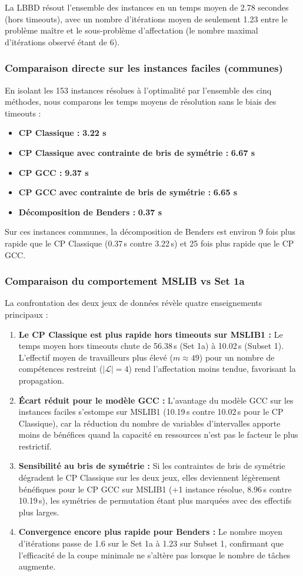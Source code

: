 La LBBD résout l'ensemble des instances en un temps moyen de 2.78 secondes (hors timeouts), avec un nombre d'itérations moyen de seulement {1.23} entre le problème maître et le sous-problème d'affectation (le nombre maximal d'itérations observé étant de 6).

\subsubsection{Comparaison directe sur les instances faciles (communes)}
En isolant les 153 instances résolues à l'optimalité par l'ensemble des cinq méthodes, nous comparons les temps moyens de résolution sans le biais des timeouts :
\begin{itemize}
    \item \textbf{CP Classique :} \textbf{3.22 s}
    \item \textbf{CP Classique avec contrainte de bris de symétrie :} \textbf{6.67 s}
    \item \textbf{CP GCC :} \textbf{9.37 s}
    \item \textbf{CP GCC avec contrainte de bris de symétrie :} \textbf{6.65 s}
    \item \textbf{Décomposition de Benders :} \textbf{0.37 s}
\end{itemize}
Sur ces instances communes, la décomposition de Benders est environ 9 fois plus rapide que le CP Classique (0.37\,s contre 3.22\,s) et 25 fois plus rapide que le CP GCC.

\subsubsection{Comparaison du comportement MSLIB vs Set 1a}
La confrontation des deux jeux de données révèle quatre enseignements principaux :
\begin{enumerate}
    \item \textbf{Le CP Classique est plus rapide hors timeouts sur MSLIB1 :} Le temps moyen hors timeouts chute de 56.38\,s (Set 1a) à 10.02\,s (Subset 1). L'effectif moyen de travailleurs plus élevé ($m \approx 49$) pour un nombre de compétences restreint ($|\mathcal{L}| = 4$) rend l'affectation moins tendue, favorisant la propagation.
    \item \textbf{Écart réduit pour le modèle GCC :} L'avantage du modèle GCC sur les instances faciles s'estompe sur MSLIB1 (10.19\,s contre 10.02\,s pour le CP Classique), car la réduction du nombre de variables d'intervalles apporte moins de bénéfices quand la capacité en ressources n'est pas le facteur le plus restrictif.
    \item \textbf{Sensibilité au bris de symétrie :} Si les contraintes de bris de symétrie dégradent le CP Classique sur les deux jeux, elles deviennent légèrement bénéfiques pour le CP GCC sur MSLIB1 (+1 instance résolue, 8.96\,s contre 10.19\,s), les symétries de permutation étant plus marquées avec des effectifs plus larges.
    \item \textbf{Convergence encore plus rapide pour Benders :} Le nombre moyen d'itérations passe de 1.6 sur le Set 1a à 1.23 sur Subset 1, confirmant que l'efficacité de la coupe minimale ne s'altère pas lorsque le nombre de tâches augmente.
\end{enumerate}

